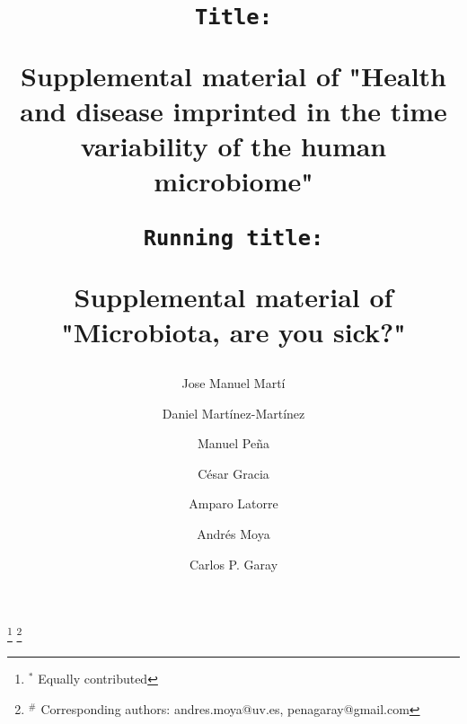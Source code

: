 \documentclass[12pt,oneside,letterpaper]{article}
\begin{document}
\title{
	\vspace*{0mm} %
	\singlespacing
	\begin{flushleft}
		\texttt{\large Title:} \\
	\end{flushleft}
	\vspace*{2mm}
	Supplemental material of "Health and disease imprinted in the time variability of the human microbiome"\\
	\vspace*{6mm}
	\begin{flushleft}
		\texttt{\large Running title:} \\
	\end{flushleft}
	\vspace*{0mm}
	Supplemental material of "Microbiota, are you sick?"
	\vspace*{4mm}
	}

\doublespacing

\author[1,2,$*$]{Jose Manuel Martí}
\author[1,2,3,$*$]{Daniel Martínez-Martínez}
\author[2]{Manuel Peña}
\author[1,2]{César Gracia}
\author[1,3,4,5]{Amparo Latorre}
\author[1,3,4,5,\#]{Andrés Moya}
\author[1,2,\#]{Carlos P. Garay}


\date{}

\maketitle
\footnote[0]{$^*$ Equally contributed}
\footnote[0]{$^\#$ Corresponding authors: andres.moya@uv.es, penagaray@gmail.com}
\end{document}
